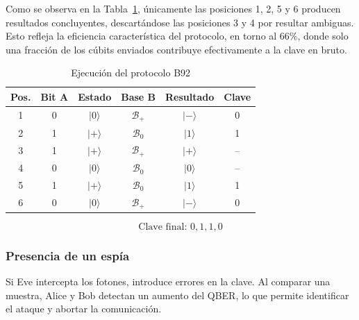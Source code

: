 Como se observa en la Tabla~\ref{tab:ejemplo_b92}, únicamente las posiciones 1, 2, 5 y 6 producen resultados concluyentes, descartándose las posiciones 3 y 4 por resultar ambiguas. Esto refleja la eficiencia característica del protocolo, en torno al 66\%, donde solo una fracción de los cúbits enviados contribuye efectivamente a la clave en bruto.

\begin{table}[h!]
\centering
\caption{Ejecución del protocolo B92}
\label{tab:ejemplo_b92}
\begin{tabular}{cccccc}
\hline
\textbf{Pos.} & \textbf{Bit A} & \textbf{Estado} & \textbf{Base B} & \textbf{Resultado} & \textbf{Clave} \\
\hline
1 & 0 & $|0\rangle$ & $\mathcal{B}_+$ & $|{-}\rangle$ & 0 \\
2 & 1 & $|{+}\rangle$ & $\mathcal{B}_0$ & $|1\rangle$ & 1 \\
3 & 1 & $|{+}\rangle$ & $\mathcal{B}_+$ & $|{+}\rangle$ & -- \\
4 & 0 & $|0\rangle$ & $\mathcal{B}_0$ & $|0\rangle$ & -- \\
5 & 1 & $|{+}\rangle$ & $\mathcal{B}_0$ & $|1\rangle$ & 1 \\
6 & 0 & $|0\rangle$ & $\mathcal{B}_+$ & $|{-}\rangle$ & 0 \\
\hline
\end{tabular}
\end{table}

\[
\text{Clave final: } 0, 1, 1, 0
\]

\subsubsection{Presencia de un espía}

Si Eve intercepta los fotones, introduce errores en la clave. Al comparar una muestra, Alice y Bob detectan un aumento del QBER, lo que permite identificar el ataque y abortar la comunicación.

